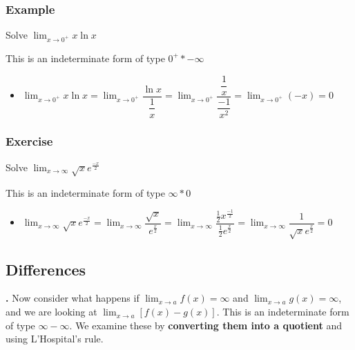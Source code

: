 \documentclass[t]{beamer}
\theoremstyle{plain}
\theoremstyle{definition}
\newcounter{heading}
\newcommand{\newhead}[1]{\medskip\stepcounter{heading}\noindent\textbf{\hspace{0.2cm}{#1}.}}
\newcommand{\limm}[1]{\displaystyle \lim_{x\to #1}}
\begin{document}
\begin{frame}

\frametitle{Example}

Solve $\limm{0^{+}}x\ln x$

This is an indeterminate form of type $0^+ * -\infty$  \pause

\begin{itemize}
	\item $\limm{0^{+}}x\ln x = \limm{0^{+}} \dfrac{\ln{x}}{\dfrac{1}{x}} = \limm{0^{+}} \dfrac{\dfrac{1}{x}}{\dfrac{-1}{x^2}} =  \limm{0^{+}} (-x) = 0$
\end{itemize}

\end{frame}

\begin{frame}

\frametitle{Exercise}

Solve $\limm{\infty}\sqrt{x}e^{\frac{-x}{2}}$

This is an indeterminate form of type $\infty * 0$  \pause

\begin{itemize}
	\item $\limm{\infty}\sqrt{x}e^{\frac{-x}{2}} = \limm{\infty}\dfrac{\sqrt{x}}{e^{\frac{x}{2}}} = \limm{\infty} \dfrac{\frac{1}{2} x^{\frac{-1}{2}}}{\frac{1}{2} e^{\frac{x}{2}}} = \limm{\infty} \dfrac{1}{\sqrt{x}e^{\frac{x}{2}}} = 0$
\end{itemize}

\end{frame}

\subsection{Differences}


\begin{frame}
\newhead{Indeterminate forms with differences}
\noindent Now consider what happens if $\limm{a}f(x) = \infty$ and $\limm{a}g(x) = \infty$, and we are looking at $\limm{a}[f(x) - g(x)]$.  This is an indeterminate form of type $\infty - \infty$.  We examine these by \textbf{converting them into a quotient} and using L'Hospital's rule.

\end{frame}
\end{document}
